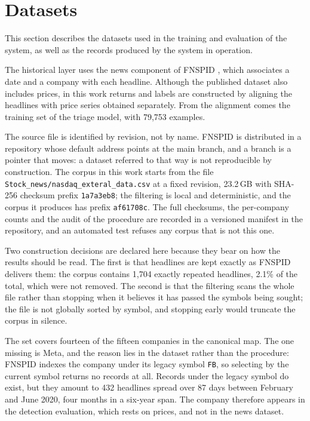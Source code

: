 \section{Datasets}
\label{sec:met_dados}

This section describes the datasets used in the training and evaluation of the system, as well as
the records produced by the system in operation.

The historical layer uses the news component of \gls{FNSPID} \autocite{dong2024fnspid}, which
associates a date and a company with each headline. Although the published dataset also includes
prices, in this work returns and labels are constructed by aligning the headlines with price
series obtained separately. From the alignment comes the training set of the
triage model, with 79{,}753 examples.

The source file is identified by revision, not by name. \Gls{FNSPID} is distributed in a
repository whose default address points at the main branch, and a branch is a pointer that moves:
a dataset referred to that way is not reproducible by construction. The corpus in this work starts
from the file \texttt{Stock\_news/nasdaq\_exteral\_data.csv} at a fixed revision, 23.2\,GB with
SHA-256 checksum prefix \texttt{1a7a3eb8}; the filtering is local and deterministic, and the corpus
it produces has prefix \texttt{af61708c}. The full checksums, the per-company counts and the audit
of the procedure are recorded in a versioned manifest in the repository, and an automated test
refuses any corpus that is not this one.

Two construction decisions are declared here because they bear on how the results should be read.
The first is that headlines are kept exactly as \gls{FNSPID} delivers them: the corpus contains
1{,}704 exactly repeated headlines, 2.1\% of the total, which were not removed. The second is that
the filtering scans the whole file rather than stopping when it believes it has passed the symbols
being sought; the file is not globally sorted by symbol, and stopping early would truncate the
corpus in silence.

The set covers fourteen of the fifteen companies in the canonical map. The one missing is Meta, and
the reason lies in the dataset rather than the procedure: \gls{FNSPID} indexes the company under its
legacy symbol \texttt{FB}, so selecting by the current symbol returns no records at all. Records
under the legacy symbol do exist, but they amount to 432 headlines spread over 87 days between
February and June 2020, four months in a six-year span. The company therefore appears in the
detection evaluation, which rests on prices, and not in the news dataset.


